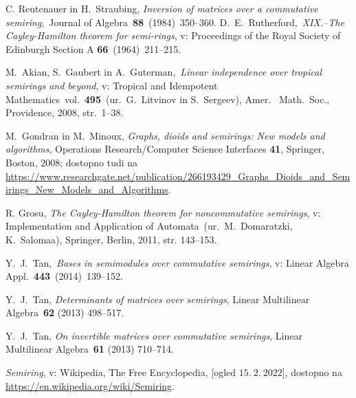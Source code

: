 \documentclass[mat1]{fmfdelo}
\begin{document}


\begin{thebibliography}{99}
	 C. Reutenauer in H.~Straubing, \emph{Inversion of matrices over a commutative semiring},~Journal of Algebra~\textbf{88}~(1984)~350--360.	
	 D.~E.~Rutherford,~\emph{XIX.--The Cayley-Hamilton theorem for semi-rings}, v: Proceedings of the Royal Society of Edinburgh Section A \textbf{66}~(1964)~211--215.

	 M.~Akian, S.~Gaubert in A.~Guterman,~\emph{Linear independence over tropical semirings and beyond}, v: Tropical and Idempotent Mathematics~vol.~\textbf{495}~(ur.\ G.~Litvinov in S.~Sergeev), Amer. \ Math.\ Soc., Providence, 2008, str.\ 1--38.
	
	 M.~Gondran in M.~Minoux, \emph{Graphs, dioids and semirings: New models and algorithms}, Operations Research/Computer Science Interfaces \textbf{41}, Springer, Boston, 2008; dostopno tudi na \url{https://www.researchgate.net/publication/266193429_Graphs_Dioids_and_Semirings_New_Models_and_Algorithms}.
	
	 R. Grosu, \emph{The Cayley-Hamilton theorem for noncommutative semirings}, v: Implementation and Application of Automata~(ur.\ M.~Domaratzki, K.~Salomaa), Springer, Berlin, 2011, str. 143--153.

	 Y.\ J.\ Tan,~\emph{Bases in semimodules over commutative semirings}, v: Linear Algebra Appl.~\textbf{443}~(2014)~139--152.
	
	 Y.\ J.\ Tan, \emph{Determinants of matrices over semirings}, Linear Multilinear Algebra~\textbf{62} (2013) 498--517.
	
	 Y.\ J.\ Tan, \emph{On invertible matrices over commutative semirings}, Linear Multilinear Algebra~\textbf{61} (2013) 710--714.
	
	 \emph{Semiring}, v: Wikipedia, The Free Encyclopedia, [ogled $15.~2.~2022$], dostopno na \url{https://en.wikipedia.org/wiki/Semiring}.
	
\end{thebibliography}
\end{document}
